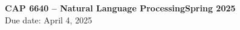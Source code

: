 \documentclass[10pt]{article}
\begin{document}
\noindent \textbf{CAP 6640 -- Natural Language Processing\hspace*{\fill}Spring 2025}\\
 \hfill Due date: April 4, 2025

\end{document}
